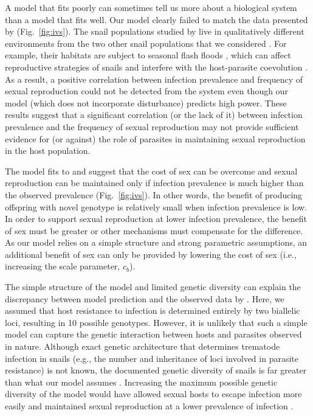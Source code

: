 \documentclass{article}\usepackage[]{graphicx}\usepackage[]{color}
\newcommand{\fref}[1]{Fig.~\ref{fig:#1}}
\begin{document}
A model that fits poorly can sometimes tell us more about a biological system than a model that fits well.
Our model clearly failed to match the data presented by \cite{dagan2013clonal} (\fref{ivs}).
The snail populations studied by \cite{dagan2013clonal} live in qualitatively different environments from the two other snail populations that we considered \citep{vergara2014infection, mckone2016fine}.
For example, their habitats are subject to seasonal flash floods \citep{ben2007temporal}, which can affect reproductive strategies of snails and interfere with the host-parasite coevolution \citep{lytle2000biotic, ben2007temporal}.
As a result, a positive correlation between infection prevalence and frequency of sexual reproduction could not be detected from the system even though our model (which does not incorporate disturbance) predicts high power.
These results suggest that a significant correlation (or the lack of it) between infection prevalence and the frequency of sexual reproduction may not provide sufficient evidence for (or against) the role of parasites in maintaining sexual reproduction in the host population.

The model fits to \cite{dagan2013clonal} and \cite{mckone2016fine} suggest that the cost of sex can be overcome and sexual reproduction can be maintained only if infection prevalence is much higher than the observed prevalence (\fref{ivs}).
In other words, the benefit of producing offspring with novel genotype is relatively small when infection prevalence is low.
In order to support sexual reproduction at lower infection prevalence, the benefit of sex must be greater or other mechanisms must compensate for the difference.
As our model relies on a simple structure and strong parametric assumptions, an additional benefit of sex can only be provided by lowering the cost of sex (i.e., increasing the scale parameter, $c_b$).

The simple structure of the model and limited genetic diversity can explain the discrepancy between model prediction and the observed data by \cite{mckone2016fine}.
Here, we assumed that host resistance to infection is determined entirely by two biallelic loci, resulting in 10 possible genotypes.
However, it is unlikely that such a simple model can capture the genetic interaction between hosts and parasites observed in nature.
Although exact genetic architecture that determines trematode infection in snails (e.g., the number and inheritance of loci involved in parasite resistance) is not known, the documented genetic diversity of snails is far greater than what our model assumes \citep{fox1996genetic, king2011parasites, dagan2013clonal}.
Increasing the maximum possible genetic diversity of the model would have allowed sexual hosts to escape infection more easily and maintained sexual reproduction at a lower prevalence of infection \citep{lively2010effect, king2012does, ashby2015diversity}.
\end{document}
